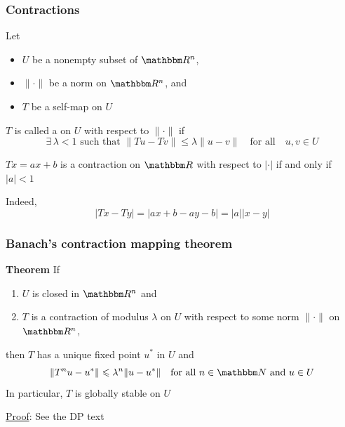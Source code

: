 \begin{frame}
    \frametitle{Contractions}
    
    Let 
    \begin{itemize}
        \item $U$ be a nonempty subset of $\RR^n$,
        \item $\| \cdot \|$ be a norm on $\RR^n$, and
        \item $T$ be a self-map on $U$

    \end{itemize}

    $T$ is called a  on $U$ with respect
    to $\| \cdot \|$ if 
    \begin{equation*}
        \text{$\exists \, \lambda < 1$ such that }
        \| Tu - Tv \| \leq \lambda \| u - v \| \quad \text{for all} \quad u, v \in U
    \end{equation*}

    \Eg $Tx = ax + b$ is a contraction on $\RR$ with respect to $| \cdot |$ 
    if and only if $|a|<1$

    Indeed, 
    \begin{equation*}
        |Tx - Ty| = |ax + b - ay - b| = |a| |x -y|
    \end{equation*}
    


\end{frame}




\begin{frame}
    \frametitle{Banach's contraction mapping theorem}
    
    {\bf Theorem} If 
    \begin{enumerate}
        \item $U$ is closed in $\RR^n$ and
        \item $T$ is a contraction of modulus $\lambda$ on $U$
        with respect to some norm $\| \cdot \|$ on $\RR^n$,
    \end{enumerate}
    then $T$ has a unique fixed point $u^*$ in $U$ and 
    \begin{equation*}
        \| T^n u - u^* \| \leq \lambda^n \| u - u^* \|
        \quad \text{for all } n \in \NN \text{ and } u \in U
    \end{equation*}
    In particular, $T$ is globally stable on $U$

    \vspace{1em}

    \underline{Proof}: See the DP text

\end{frame}


